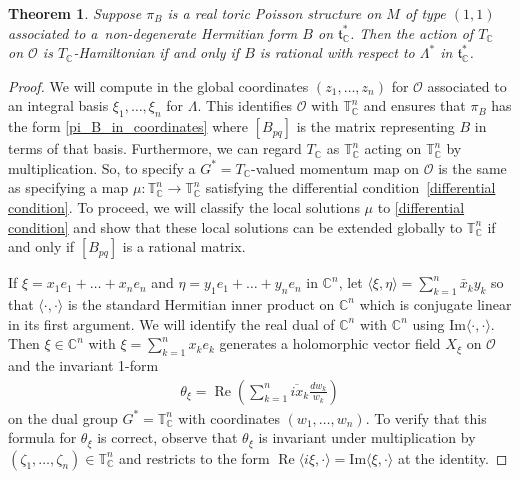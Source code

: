 \documentclass[pdftex]{sigma}
\numberwithin{equation}{section}
\newtheorem{Theorem}{Theorem}[section]
\begin{document}
\begin{Theorem}
Suppose $\pi_B$ is a real toric Poisson structure on $M$ of type $(1,1)$ associated to a~non-degenerate Hermitian form $B$ on ${\mathfrak t}_{\mathbb C}^*$. Then the action of $T_{\mathbb C}$ on $\mathcal O$ is $T_{\mathbb C}$-Hamiltonian if and only if $B$ is rational with respect to $\Lambda^*$ in ${\mathfrak t}_{\mathbb C}^*$.
\end{Theorem}
\begin{proof}
We will compute in the global coordinates $(z_1,\dots,z_n)$ for $\mathcal O$ associated to an integral basis $\xi_1,\dots,\xi_n$ for $\Lambda$. This identif\/ies $\mathcal O$ with ${\mathbb T}_{\mathbb C}^n$ and ensures that $\pi_B$ has the form \eqref{pi_B_in_coordinates} where $[B_{pq}]$ is the matrix representing $B$ in terms of that basis. Furthermore, we can regard $T_{\mathbb C}$ as ${\mathbb T}_{\mathbb C}^n$ acting on ${\mathbb T}_{\mathbb C}^n$ by multiplication. So, to specify a $G^*=T_{\mathbb C}$-valued momentum map on $\mathcal O$ is the same as specifying a map $\mu\colon {\mathbb T}_{\mathbb C}^n\to{\mathbb T}_{\mathbb C}^n$ satisfying the dif\/ferential condition~\eqref{differential condition}. To proceed, we will classify the local solutions $\mu$ to \eqref{differential condition} and show that these local solutions can be extended globally to ${\mathbb T}_{\mathbb C}^n$ if and only if $[B_{pq}]$ is a rational matrix.

If $\xi=x_1e_1+\dots+x_ne_n$ and $\eta=y_1e_1+\dots+y_ne_n$ in ${\mathbb C}^n$, let $\langle \xi,\eta\rangle = \sum\limits_{k=1}^n \bar{x}_ky_k$ so that $\langle\cdot,\cdot\rangle$ is the standard Hermitian inner product on ${\mathbb C}^n$ which is conjugate linear in its f\/irst argument. We will identify the real dual of ${\mathbb C}^n$ with ${\mathbb C}^n$ using $\mathrm{Im}\langle\cdot,\cdot\rangle$. Then $\xi\in{\mathbb C}^n$ with $\xi=\sum\limits_{k=1}^n x_ke_k$ generates a holomorphic vector f\/ield $X_\xi$ on $\mathcal O$ and the invariant 1-form
\begin{gather*}
\theta_\xi = \operatorname{Re}\left(\sum_{k=1}^n \overline{ix}_k\frac{dw_k}{w_k}\right)
\end{gather*}
on the dual group $G^*={\mathbb T}_{\mathbb C}^n$ with coordinates $(w_1,\dots,w_n)$. To verify that this formula for $\theta_\xi$ is correct, observe that $\theta_\xi$ is invariant under multiplication by $(\zeta_1,\dots,\zeta_n)\in {\mathbb T}_{\mathbb C}^n$ and restricts to the form $\operatorname{Re}\langle i\xi,\cdot\rangle=\mathrm{Im}\langle \xi,\cdot\rangle$ at the identity.


\end{proof}
\end{document}
